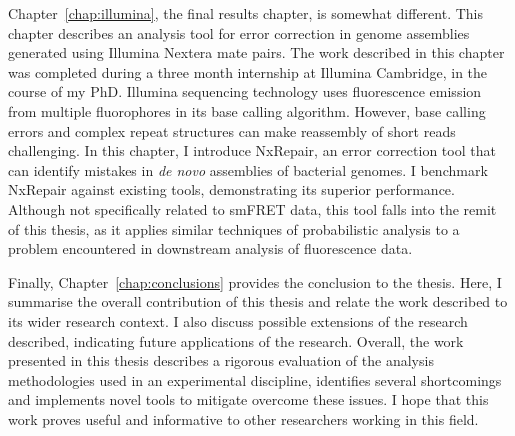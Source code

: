 Chapter~\ref{chap:illumina}, the final results chapter, is somewhat different. This chapter describes an analysis tool for error correction in genome assemblies generated using Illumina Nextera mate pairs. The work described in this chapter was completed during a three month internship at Illumina Cambridge, in the course of my PhD. Illumina sequencing technology uses fluorescence emission from multiple fluorophores in its base calling algorithm. However, base calling errors and complex repeat structures can make reassembly of short reads challenging. In this chapter, I introduce NxRepair, an error correction tool that can identify mistakes in \emph{de novo} assemblies of bacterial genomes. I benchmark NxRepair against existing tools, demonstrating its superior performance. Although not specifically related to smFRET data, this tool falls into the remit of this thesis, as it applies similar techniques of probabilistic analysis to a problem encountered in downstream analysis of fluorescence data.

Finally, Chapter~\ref{chap:conclusions} provides the conclusion to the thesis. Here, I summarise the overall contribution of this thesis and relate the work described to its wider research context. I also discuss possible extensions of the research described, indicating future applications of the research. Overall, the work presented in this thesis describes a rigorous evaluation of the analysis methodologies used in an experimental discipline, identifies several shortcomings and implements novel tools to mitigate overcome these issues. I hope that this work proves useful and informative to other researchers working in this field.


